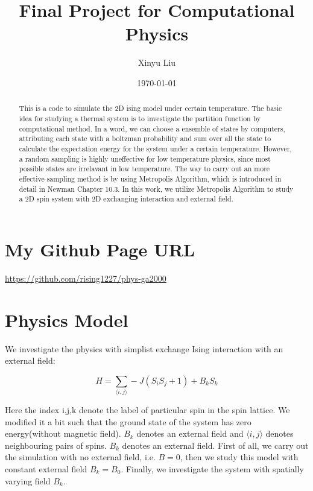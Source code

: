 \documentclass[letterpaper,12pt]{article}
\title{Final Project for Computational Physics}
\date{\today}
\author{Xinyu Liu}
\begin{document}
\maketitle

\begin{abstract}
    This is a code to simulate the 2D ising model under certain temperature. The basic idea for studying a thermal system is to investigate the partition function by computational method. In a word, we can choose a ensemble of states by computers, attributing each state with a boltzman probability and sum over all the state to calculate the expectation energy for the system under a certain temperature. However, a random sampling is highly uneffective for low temperature physics, since most possible states are irrelavant in low temperature. The way to carry out an more effective sampling method is by using Metropolis Algorithm, which is introduced in detail in Newman Chapter 10.3. In this work, we utilize Metropolis Algorithm to study a 2D spin system with 2D exchanging interaction and external field.
\end{abstract}

\tableofcontents



\newpage

\section{My Github Page URL}
\url{https://github.com/rising1227/phys-ga2000}

\section{Physics Model}

We investigate the physics with simplist exchange Ising interaction with an external field:

\begin{equation}
    H = \sum_{\langle i,j \rangle} -J (S_i S_j+1) + B_{k} S_k
\end{equation}

Here the index i,j,k denote the label of particular spin in the spin lattice. We modified it a bit such that the ground state of the system has zero energy(without magnetic field). $B_{k}$ denotes an external field and $\langle i,j \rangle$ denotes neighbouring pairs of spins. $B_{k}$ denotes an external field. First of all, we carry out the simulation with no external field, i.e. $B=0$, then we study this model with constant external field $B_{k} = B_0$. Finally, we investigate the system with spatially varying field $B_k$.
\end{document}
